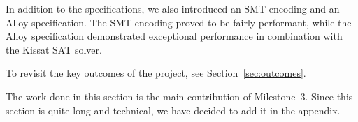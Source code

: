 \documentclass[12pt]{article}
\begin{document}
In addition to the \tlap{} specifications, we also introduced an SMT encoding
and an Alloy specification. The SMT encoding proved to be fairly performant,
while the Alloy specification demonstrated exceptional performance in
combination with the Kissat SAT solver.

To revisit the key outcomes of the project, see Section~\ref{sec:outcomes}.




\pagebreak

\appendix

The work done in this section is the main contribution of Milestone~3. Since
this section is quite long and technical, we have decided to add it in the
appendix.




\end{document}
